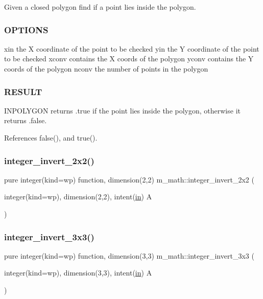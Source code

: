 Given a closed polygon find if a point lies inside the polygon.

\subsubsection*{O\+P\+T\+I\+O\+NS}

xin the X coordinate of the point to be checked yin the Y coordinate of the point to be checked xconv contains the X coords of the polygon yconv contains the Y coords of the polygon nconv the number of points in the polygon

\subsubsection*{R\+E\+S\+U\+LT}

I\+N\+P\+O\+L\+Y\+G\+ON returns .true if the point lies inside the polygon, otherwise it returns .false. 

References false(), and true().

\mbox{\label{namespacem__math_abccb5c1bfc17724aca07448be7b1d2c8}} 
\subsubsection{\texorpdfstring{integer\+\_\+invert\+\_\+2x2()}{integer\_invert\_2x2()}}
{\footnotesize\ttfamily pure integer(kind=wp) function, dimension(2,2) m\+\_\+math\+::integer\+\_\+invert\+\_\+2x2 (\begin{DoxyParamCaption}\item[{integer(kind=wp), dimension(2,2), intent(\hyperlink{M__journal_83_8txt_afce72651d1eed785a2132bee863b2f38}{in})}]{A }\end{DoxyParamCaption})\hspace{0.3cm}{\ttfamily [private]}}

\mbox{\label{namespacem__math_aa8aaf1df6257440a637e51922f2d482f}} 
\subsubsection{\texorpdfstring{integer\+\_\+invert\+\_\+3x3()}{integer\_invert\_3x3()}}
{\footnotesize\ttfamily pure integer(kind=wp) function, dimension(3,3) m\+\_\+math\+::integer\+\_\+invert\+\_\+3x3 (\begin{DoxyParamCaption}\item[{integer(kind=wp), dimension(3,3), intent(\hyperlink{M__journal_83_8txt_afce72651d1eed785a2132bee863b2f38}{in})}]{A }\end{DoxyParamCaption})\hspace{0.3cm}{\ttfamily [private]}}


